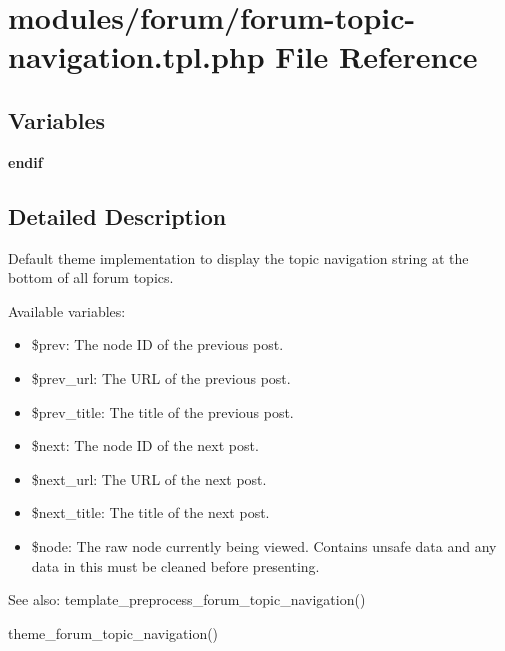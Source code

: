 \hypertarget{forum-topic-navigation_8tpl_8php}{
\section{modules/forum/forum-topic-navigation.tpl.php File Reference}
\label{forum-topic-navigation_8tpl_8php}
}
\subsection*{Variables}
\begin{CompactItemize}
\item 
\hypertarget{forum-topic-navigation_8tpl_8php_82cd33ca97ff99f2fcc5e9c81d65251b}{
\textbf{endif}}
\label{forum-topic-navigation_8tpl_8php_82cd33ca97ff99f2fcc5e9c81d65251b}

\end{CompactItemize}


\subsection{Detailed Description}
Default theme implementation to display the topic navigation string at the bottom of all forum topics.

Available variables:

\begin{itemize}
\item \$prev: The node ID of the previous post.\item \$prev\_\-url: The URL of the previous post.\item \$prev\_\-title: The title of the previous post.\end{itemize}


\begin{itemize}
\item \$next: The node ID of the next post.\item \$next\_\-url: The URL of the next post.\item \$next\_\-title: The title of the next post.\end{itemize}


\begin{itemize}
\item \$node: The raw node currently being viewed. Contains unsafe data and any data in this must be cleaned before presenting.\end{itemize}


\begin{Desc}
\item[See also:]template\_\-preprocess\_\-forum\_\-topic\_\-navigation() 

theme\_\-forum\_\-topic\_\-navigation() \end{Desc}
